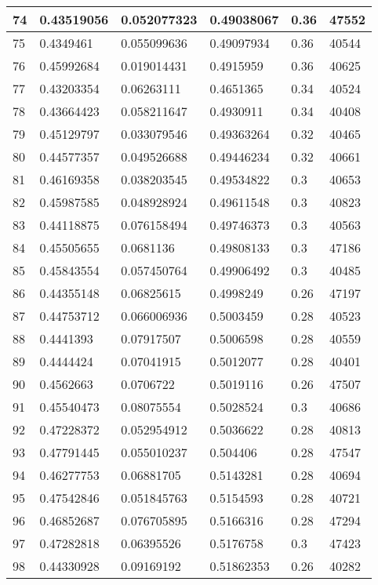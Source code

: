 \begin{longtable}{|l|l|l|l|l|l|}
74 & 0.43519056 & 0.052077323 & 0.49038067 & 0.36 & 47552 \\ \hline 
75 & 0.4349461 & 0.055099636 & 0.49097934 & 0.36 & 40544 \\ \hline 
76 & 0.45992684 & 0.019014431 & 0.4915959 & 0.36 & 40625 \\ \hline 
77 & 0.43203354 & 0.06263111 & 0.4651365 & 0.34 & 40524 \\ \hline 
78 & 0.43664423 & 0.058211647 & 0.4930911 & 0.34 & 40408 \\ \hline 
79 & 0.45129797 & 0.033079546 & 0.49363264 & 0.32 & 40465 \\ \hline 
80 & 0.44577357 & 0.049526688 & 0.49446234 & 0.32 & 40661 \\ \hline 
81 & 0.46169358 & 0.038203545 & 0.49534822 & 0.3 & 40653 \\ \hline 
82 & 0.45987585 & 0.048928924 & 0.49611548 & 0.3 & 40823 \\ \hline 
83 & 0.44118875 & 0.076158494 & 0.49746373 & 0.3 & 40563 \\ \hline 
84 & 0.45505655 & 0.0681136 & 0.49808133 & 0.3 & 47186 \\ \hline 
85 & 0.45843554 & 0.057450764 & 0.49906492 & 0.3 & 40485 \\ \hline 
86 & 0.44355148 & 0.06825615 & 0.4998249 & 0.26 & 47197 \\ \hline 
87 & 0.44753712 & 0.066006936 & 0.5003459 & 0.28 & 40523 \\ \hline 
88 & 0.4441393 & 0.07917507 & 0.5006598 & 0.28 & 40559 \\ \hline 
89 & 0.4444424 & 0.07041915 & 0.5012077 & 0.28 & 40401 \\ \hline 
90 & 0.4562663 & 0.0706722 & 0.5019116 & 0.26 & 47507 \\ \hline 
91 & 0.45540473 & 0.08075554 & 0.5028524 & 0.3 & 40686 \\ \hline 
92 & 0.47228372 & 0.052954912 & 0.5036622 & 0.28 & 40813 \\ \hline 
93 & 0.47791445 & 0.055010237 & 0.504406 & 0.28 & 47547 \\ \hline 
94 & 0.46277753 & 0.06881705 & 0.5143281 & 0.28 & 40694 \\ \hline 
95 & 0.47542846 & 0.051845763 & 0.5154593 & 0.28 & 40721 \\ \hline 
96 & 0.46852687 & 0.076705895 & 0.5166316 & 0.28 & 47294 \\ \hline 
97 & 0.47282818 & 0.06395526 & 0.5176758 & 0.3 & 47423 \\ \hline 
98 & 0.44330928 & 0.09169192 & 0.51862353 & 0.26 & 40282 \\ \hline 

\end{longtable}

